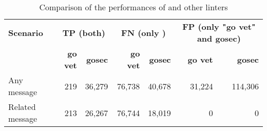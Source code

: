 \begin{table}[htp!]
    \centering
    \caption{Comparison of the performances of \toolGeiger{} and other linters}
    \label{tbl:go-geiger-evaluation-linters}
    \begin{tabular}{l|rr|rr|rr}
        \textbf{Scenario} & \multicolumn{2}{c|}{\textbf{TP (both)}} & \multicolumn{2}{c|}{\textbf{FN (only \toolGeiger{})}} & \multicolumn{2}{c}{\textbf{FP (only "go vet" and gosec)}} \\
        {}                & \textbf{go vet} & \textbf{gosec}        & \textbf{go vet} & \textbf{gosec}                      & \textbf{go vet} & \textbf{gosec}              \\
        \hline
        Any message       & 219             & 36,279                & 76,738          & 40,678                              &  31,224         & 114,306                     \\
        Related message   & 213             & 26,267                & 76,744          & 18,019                              &       0         & 0                           \\
    \end{tabular}
\end{table}
